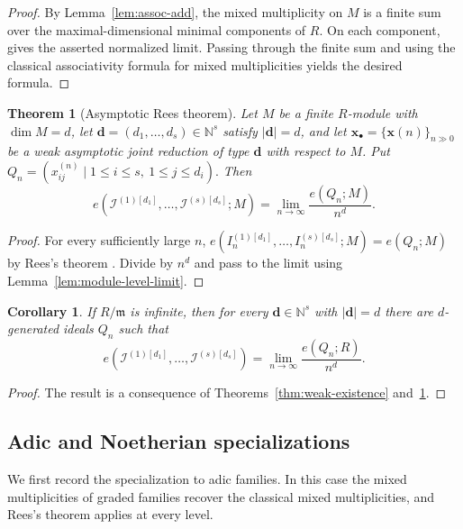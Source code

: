 \documentclass[reqno,12pt]{amsart}
\theoremstyle{plain}
\newtheorem{thm}[prop]{Theorem}
\newtheorem{cor}[prop]{Corollary}
\theoremstyle{definition}
\theoremstyle{remark}
\newcommand{\N}{\mathbb N}
\numberwithin{equation}{section}
\begin{document}
\begin{proof}
By Lemma~\ref{lem:assoc-add}, the mixed multiplicity on $M$ is a finite
sum over the maximal-dimensional minimal components of $R$. On each
component, \cite[Equation~(9)]{Cutkosky2026} gives the asserted
normalized limit. Passing through the finite sum and using the classical
associativity formula for mixed multiplicities
\cite[Lemma~17.4.4]{SwansonHuneke} yields the desired  formula.
\end{proof}

\begin{thm}[Asymptotic Rees theorem]
\label{thm:weak-rees}
Let $M$ be a finite $R$-module with $\dim M=d$, let
$\mathbf d=(d_1,\ldots,d_s)\in\N^s$ satisfy $|\mathbf d|=d$, and let
$\mathbf x_\bullet=\{\mathbf x(n)\}_{n\gg0}$ be a weak asymptotic joint
reduction of type $\mathbf d$ with respect to $M$. Put $Q_n=(x_{ij}^{(n)}\mid 1\leq i\leq s,\ 1\leq j\leq d_i).$
Then
\[
e\!\left(\mathcal I^{(1)[d_1]},\ldots,
\mathcal I^{(s)[d_s]};M\right)
=
\lim_{n\to\infty}\frac{e(Q_n;M)}{n^d}.
\]
\end{thm}

\begin{proof}
For every sufficiently large $n$,
$e(I_n^{(1)[d_1]},\ldots,I_n^{(s)[d_s]};M)=e(Q_n;M)$ by  Rees's theorem
\cite[Theorem~17.4.9]{SwansonHuneke}.
Divide by $n^d$ and pass to the limit using
Lemma~\ref{lem:module-level-limit}.
\end{proof}

\begin{cor}
\label{cor:weak-realization}
If $R/\mathfrak m$ is infinite, then for every
$\mathbf d\in\N^s$ with $|\mathbf d|=d$ there are $d$-generated ideals
$Q_n$ such that
\[
e\!\left(\mathcal I^{(1)[d_1]},\ldots,
\mathcal I^{(s)[d_s]}\right)
=
\lim_{n\to\infty}\frac{e(Q_n;R)}{n^d}.
\]
\end{cor}

\begin{proof}
The result is a consequence of  Theorems~\ref{thm:weak-existence} and~\ref{thm:weak-rees}.
\end{proof}

\subsection*{Adic and Noetherian specializations}

We first record the specialization to adic families. In this case the
mixed multiplicities of graded families recover the classical mixed
multiplicities, and Rees's theorem
\cite[Theorem~17.4.9]{SwansonHuneke} applies at every level.
\end{document}
